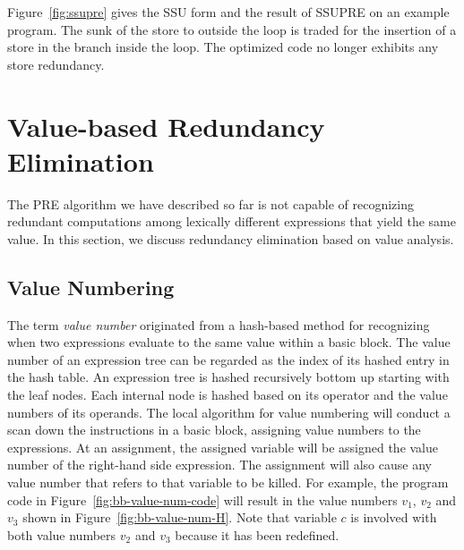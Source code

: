 Figure~\ref{fig:ssupre} gives the SSU form and the result of SSUPRE on an example program. 
The sunk of the store to outside the loop is traded for the insertion of a store in the branch inside the loop. 
The optimized code no longer exhibits any store redundancy.

\section{Value-based Redundancy Elimination}
\label{section:Part3:Pre_not_helped:SemanticPRE}
The PRE algorithm we have described so far is not capable of recognizing redundant computations among lexically different expressions that yield the same value. 
In this section, we discuss redundancy elimination based on value analysis.

\subsection{Value Numbering}
\label{sec:pre_not_helped:GVN}  
The term \emph{value number} originated from a hash-based method for recognizing when two expressions evaluate to the same value within a basic block. 
The value number of an expression tree can be regarded as the index of its hashed entry in the hash table. 
An expression tree is hashed recursively bottom up starting with the leaf nodes. 
Each internal node is hashed based on its operator and the value numbers of its operands. 
The local algorithm for value numbering will conduct a scan down the instructions in a basic block, assigning value numbers to the expressions. 
At an assignment, the assigned variable will be assigned the value number of the right-hand side expression. 
The assignment will also cause any value number that refers to that variable to be killed. 
For example, the program code in Figure~\ref{fig:bb-value-num-code} will result in the value numbers $v_1$, $v_2$ and $v_3$ shown in Figure~\ref{fig:bb-value-num-H}. 
Note that variable $c$ is involved with both value numbers $v_2$ and $v_3$ because it has been redefined.

